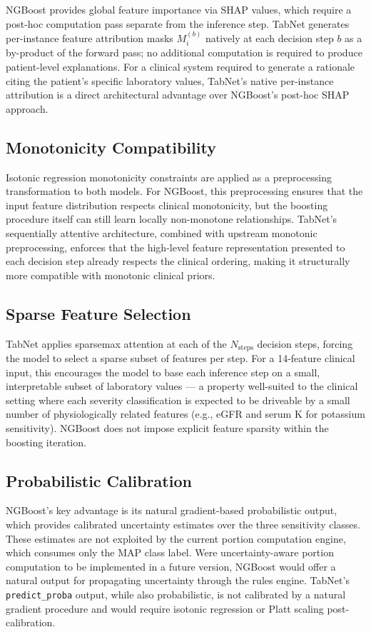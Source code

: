\documentclass[journal]{IEEEtran}
\begin{document}
NGBoost provides global feature importance via SHAP values, which
require a post-hoc computation pass separate from the inference step.
TabNet generates per-instance feature attribution masks $M^{(b)}_i$
natively at each decision step $b$ as a by-product of the forward pass;
no additional computation is required to produce patient-level
explanations. For a clinical system required to generate a rationale
citing the patient's specific laboratory values, TabNet's native
per-instance attribution is a direct architectural advantage over
NGBoost's post-hoc SHAP approach.

\subsection{Monotonicity Compatibility}

Isotonic regression monotonicity constraints are applied as a
preprocessing transformation to both models. For NGBoost, this
preprocessing ensures that the input feature distribution respects
clinical monotonicity, but the boosting procedure itself can still
learn locally non-monotone relationships. TabNet's sequentially
attentive architecture, combined with upstream monotonic preprocessing,
enforces that the high-level feature representation presented to each
decision step already respects the clinical ordering, making it
structurally more compatible with monotonic clinical priors.

\subsection{Sparse Feature Selection}

TabNet applies sparsemax attention at each of the $N_{\text{steps}}$
decision steps, forcing the model to select a sparse subset of features
per step. For a 14-feature clinical input, this encourages the model to
base each inference step on a small, interpretable subset of laboratory
values --- a property well-suited to the clinical setting where each
severity classification is expected to be driveable by a small number of
physiologically related features (e.g., eGFR and serum K for
potassium sensitivity). NGBoost does not impose explicit feature
sparsity within the boosting iteration.

\subsection{Probabilistic Calibration}

NGBoost's key advantage is its natural gradient-based probabilistic
output, which provides calibrated uncertainty estimates over the three
sensitivity classes. These estimates are not exploited by the current
portion computation engine, which consumes only the MAP class label.
Were uncertainty-aware portion computation to be implemented in a future
version, NGBoost would offer a natural output for propagating
uncertainty through the rules engine. TabNet's \texttt{predict\_proba}
output, while also probabilistic, is not calibrated by a natural gradient
procedure and would require isotonic regression or Platt scaling
post-calibration.
\end{document}
